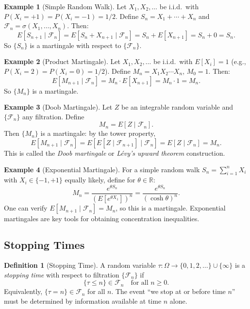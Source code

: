 \documentclass[12pt, a4paper]{article}
\theoremstyle{definition}
\newtheorem{definition}{Definition}[section]
\newtheorem{example}{Example}[section]
\theoremstyle{plain}
\begin{document}
\begin{example}[Simple Random Walk]
Let $X_1, X_2, \ldots$ be i.i.d.\ with $P(X_i = +1) = P(X_i = -1) = 1/2$. Define $S_n = X_1 + \cdots + X_n$ and $\mathcal{F}_n = \sigma(X_1, \ldots, X_n)$. Then:
\[
  E[S_{n+1} \mid \mathcal{F}_n] = E[S_n + X_{n+1} \mid \mathcal{F}_n] = S_n + E[X_{n+1}] = S_n + 0 = S_n.
\]
So $\{S_n\}$ is a martingale with respect to $\{\mathcal{F}_n\}$.
\end{example}

\begin{example}[Product Martingale]
Let $X_1, X_2, \ldots$ be i.i.d.\ with $E[X_i] = 1$ (e.g., $P(X_i = 2) = P(X_i = 0) = 1/2$). Define $M_n = X_1 X_2 \cdots X_n$, $M_0 = 1$. Then:
\[
  E[M_{n+1} \mid \mathcal{F}_n] = M_n \cdot E[X_{n+1}] = M_n \cdot 1 = M_n.
\]
So $\{M_n\}$ is a martingale.
\end{example}

\begin{example}[Doob Martingale]
Let $Z$ be an integrable random variable and $\{\mathcal{F}_n\}$ any filtration. Define
\[
  M_n = E[Z \mid \mathcal{F}_n].
\]
Then $\{M_n\}$ is a martingale: by the tower property,
\[
  E[M_{n+1} \mid \mathcal{F}_n] = E[E[Z \mid \mathcal{F}_{n+1}] \mid \mathcal{F}_n] = E[Z \mid \mathcal{F}_n] = M_n.
\]
This is called the \emph{Doob martingale} or \emph{Lévy's upward theorem} construction.
\end{example}

\begin{example}[Exponential Martingale]
For a simple random walk $S_n = \sum_{i=1}^n X_i$ with $X_i \in \{-1, +1\}$ equally likely, define for $\theta \in \mathbb{R}$:
\[
  M_n = \frac{e^{\theta S_n}}{(E[e^{\theta X_1}])^n} = \frac{e^{\theta S_n}}{\left(\cosh\theta\right)^n}.
\]
One can verify $E[M_{n+1} \mid \mathcal{F}_n] = M_n$, so this is a martingale. Exponential martingales are key tools for obtaining concentration inequalities.
\end{example}

\subsection{Stopping Times}

\begin{definition}[Stopping Time]
A random variable $\tau : \Omega \to \{0, 1, 2, \ldots\} \cup \{\infty\}$ is a \emph{stopping time} with respect to filtration $\{\mathcal{F}_n\}$ if
\[
  \{\tau \leq n\} \in \mathcal{F}_n \quad \text{for all } n \geq 0.
\]
Equivalently, $\{\tau = n\} \in \mathcal{F}_n$ for all $n$. The event ``we stop at or before time $n$'' must be determined by information available at time $n$ alone.
\end{definition}
\end{document}
